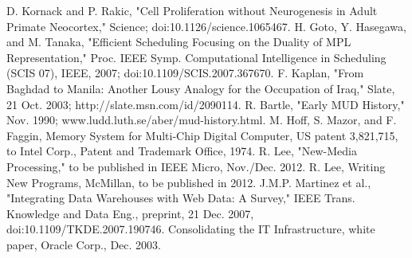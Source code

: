 \documentclass[11pt, onecolumn, twoside, a4paper]{article}
\begin{document}
\begin{thebibliography}{9}
 D. Kornack and P. Rakic, "Cell Proliferation without Neurogenesis in Adult Primate Neocortex," Science; doi:10.1126/science.1065467.
 H. Goto, Y. Hasegawa, and M. Tanaka, "Efficient Scheduling Focusing on the Duality of MPL Representation," Proc. IEEE Symp. Computational Intelligence in Scheduling (SCIS 07), IEEE, 2007; doi:10.1109/SCIS.2007.367670.
 F. Kaplan, "From Baghdad to Manila: Another Lousy Analogy for the Occupation of Iraq," Slate, 21 Oct. 2003; http://slate.msn.com/id/2090114.
 R. Bartle, "Early MUD History," Nov. 1990; www.ludd.luth.se/aber/mud-history.html.
 M. Hoff, S. Mazor, and F. Faggin, Memory System for Multi-Chip Digital Computer, US patent 3,821,715, to Intel Corp., Patent and Trademark Office, 1974.
 R. Lee, "New-Media Processing," to be published in IEEE Micro, Nov./Dec. 2012.
 R. Lee, Writing New Programs, McMillan, to be published in 2012.
 J.M.P. Martinez et al., "Integrating Data Warehouses with Web Data: A Survey," IEEE Trans. Knowledge and Data Eng., preprint, 21 Dec. 2007, doi:10.1109/TKDE.2007.190746.
 Consolidating the IT Infrastructure, white paper, Oracle Corp., Dec. 2003.

 
\end{thebibliography}
\end{document}
